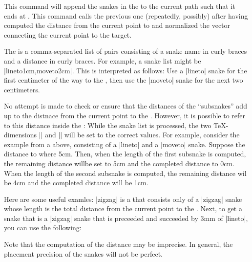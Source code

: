\begin{command}{\pgfpathsnakesto{}}
  This command will append the snakes in the   to the
  current path such that it ends at . This command calls the previous 
  one (repeatedly, possibly) after having computed the distance from
  the current point to  and normalized the vector
  connecting the current point to the target.

  The  is a comma-separated list of pairs consisting
  of a snake name in curly braces and a distance in curly braces. For
  example, a snake list might be |{lineto}{1cm},{moveto}{2cm}|. This
  is interpreted as follows: Use a |lineto| snake for the first
  centimeter of the way to the , then use the |moveto|
  snake for the next two centimeters.

  No attempt is made to check or ensure that the distances of the
  ``subsnakes'' add up to the distnace from the current point to the
  . However, it is possible to refer to this distance
  inside the : While the snake list is processed, the
  two \TeX-dimensions |\pgfsnakeremainingdistance| and
  |\pgfsnakecompleteddistance| will be set to the correct values. For
  example, consider the example from a above, consisting of a |lineto|
  and a |moveto| snake. Suppose the distance to  where
  5cm. Then, when the length of the first subsnake is computed, the
  remaining distance willbe set to 5cm and the completed distance to
  0cm. When the length of the second subsnake is computed, the
  remaining distance wil be 4cm and the completed distance will be
  1cm.

  Here are some useful examles: |{zigzag}{\pgfsnakeremainingdistance}|
  is a  that consists only of a |zigzag| snake whose
  length is the total distance from the current point to the
  . Next, to get a snake that is a |zigzag| snake that is
  preceeded and succeeded by 3mm of |lineto|, you can use the
  following:
\begin{codeexample}[]
\end{codeexample}

  Note that the computation of the distance may be imprecise. In
  general, the placement precision of the snakes will not be perfect. 
\end{command}

